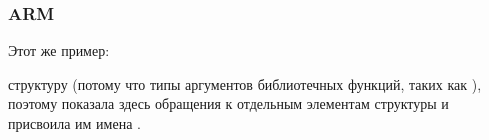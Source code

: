 ﻿\subsubsection{ARM}

\myparagraph{\OptimizingKeilVI (\ThumbMode)}

Этот же пример:



\myparagraph{\OptimizingXcodeIV (\ThumbTwoMode)}

\IDA {} структуру  
(потому что \IDA {} типы аргументов библиотечных функций, 
таких как ), 
поэтому показала здесь обращения к отдельным элементам структуры и присвоила им имена
.


